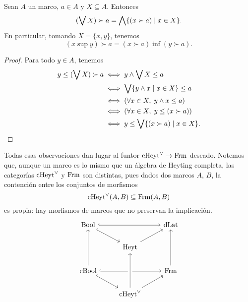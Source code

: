 \begin{lemma}\label{demorim}
  Sean $A$ un marco, $a\in A$ y $X\subseteq A$.
  Entonces
  \[
      (\bigvee X)\succ a = \bigwedge\{(x\succ a) \mid x\in X\}
  .\]
  En particular, tomando $X=\{x,y\}$, tenemos
  \[
      (x\sup y)\succ a = (x\succ a)\inf(y\succ a)
  .\]
\end{lemma}
\begin{proof}
  Para todo $y\in A$, tenemos
  \begin{align*}
      y\leq (\bigvee X)\succ a
      &\iff y\wedge \bigvee X \leq a \\
      &\iff \bigvee\{y\wedge x\mid x\in X\} \leq a \\
      &\iff (\forall x\in X,\; y\wedge x\leq a) \\
      &\iff (\forall x\in X,\; y\leq(x\succ a)) \\
      &\iff y\leq \bigvee\{(x\succ a)\mid x\in X\}.
  \end{align*}
\end{proof}



Todas esas observaciones dan lugar al funtor $\mathrm{cHeyt}^\vee\to\mathrm{Frm}$ deseado.
Notemos que, aunque un marco es lo mismo que un álgebra de Heyting
completa, las categorías $\mathrm{cHeyt}^\vee$ y $\mathrm{Frm}$ son distintas, pues dados
dos marcos $A$, $B$, la contención entre los conjuntos de morfismos
\begin{equation}
  \mathrm{cHeyt}^\vee(A,B) \subseteq \mathrm{Frm}(A,B)
\end{equation}
es propia: hay morfismos de marcos que no preservan la implicación.
\begin{equation}\label{diag:prisma-cheyt-completo}
\begin{tikzcd}
  \Bool \ar[dr,hook] \ar[rr,hook] &               & \DLat \\
                                  & \Heyt \ar[ur]         \\
  \CBA \ar[uu] \ar[rr,hook] \ar[dr,hook] & & \Frm \ar[uu]    \\
                            & \cHeyt \ar[uu,crossing over] \ar[ur]
\end{tikzcd}
\end{equation}


